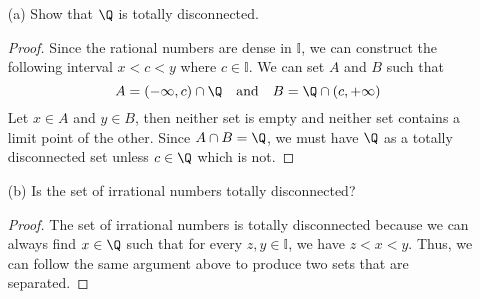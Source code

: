 \begin{enumerate}
    \item[(a)] Show that \( \Q  \) is totally disconnected.
        \begin{proof}
            Since the rational numbers are dense in \( \mathbb{I} \), we can construct the following interval \( x < c < y  \) where \( c \in \mathbb{I}  \). We can set \( A  \) and \( B \) such that 
            \[  A = (-\infty, c ) \cap \Q \text{ ~ and ~ } B = \Q \cap (c, +\infty )   \]
            Let \( x \in A  \) and \( y \in B  \), then neither set is empty and neither set contains a limit  point of the other. Since \( A \cap B = \Q  \), we must have \( \Q  \) as a totally disconnected set unless \( c \in \Q  \) which is not. 
        \end{proof}
    \item[(b)] Is the set of irrational numbers totally disconnected? 
        \begin{proof}
            The set of irrational numbers is totally disconnected because we can always find \( x \in \Q  \) such that for every \( z,y \in \mathbb{I} \), we have \( z < x < y  \). Thus, we can follow the same argument above to produce two sets that are separated.
        \end{proof}
\end{enumerate}


